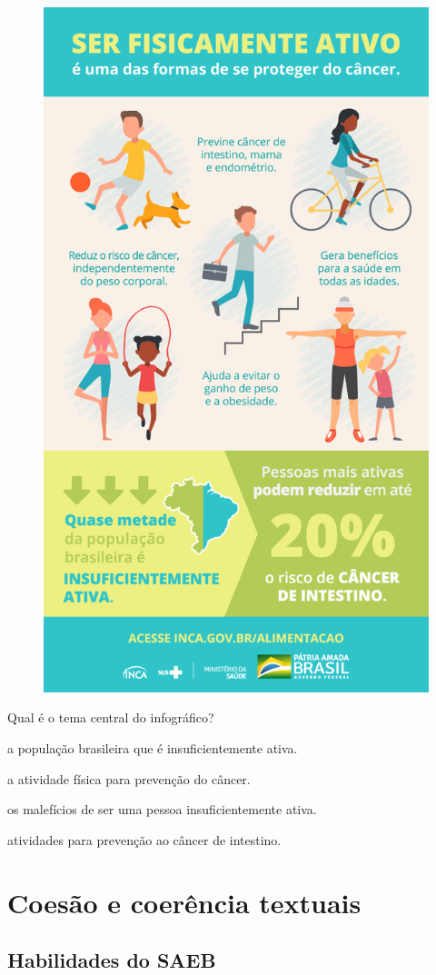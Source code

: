 \begin{figure}[htpb!]
\centering
\includegraphics[width=.5\textwidth]{media/image34.jpeg}
\end{figure}


Qual é o tema central do infográfico?

\begin{escolha}
\item a população brasileira que é insuficientemente ativa.

\item a atividade física para prevenção do câncer.

\item os malefícios de ser uma pessoa insuficientemente ativa.

\item atividades para prevenção ao câncer de intestino.
\end{escolha}
\pagebreak

\chapter{Coesão e coerência textuais}

\section*{Habilidades do SAEB}

